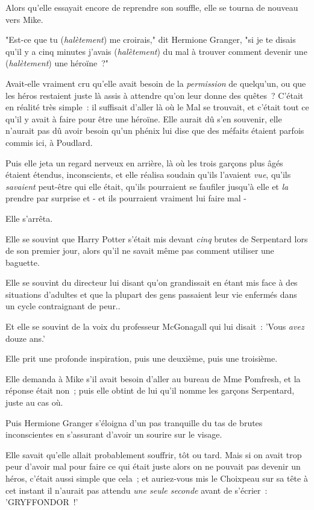 Alors qu'elle essayait encore de reprendre son souffle, elle se tourna de nouveau vers Mike.

"Est-ce que tu (\emph{halètement}) me croirais," dit Hermione Granger, "si je te disais qu'il y a cinq minutes j'avais (\emph{halètement}) du mal à trouver comment devenir une (\emph{halètement}) une héroïne~?"

Avait-elle vraiment cru qu'elle avait besoin de la \emph{permission} de quelqu'un, ou que les héros restaient juste là assis à attendre qu'on leur donne des quêtes~? C'était en réalité très simple~: il suffisait d'aller là où le Mal se trouvait, et c'était tout ce qu'il y avait à faire pour être une héroïne. Elle aurait dû s'en souvenir, elle n'aurait pas dû avoir besoin qu'un phénix lui dise que des méfaits étaient parfois commis ici, à Poudlard.

Puis elle jeta un regard nerveux en arrière, là où les trois garçons plus âgés étaient étendus, inconscients, et elle réalisa soudain qu'ils l'avaient \emph{vue}, qu'ils \emph{savaient} peut-être qui elle était, qu'ils pourraient se faufiler jusqu'à elle et \emph{la} prendre par surprise et - et ils pourraient vraiment lui faire mal -

Elle s'arrêta.

Elle se souvint que Harry Potter s'était mis devant \emph{cinq} brutes de Serpentard lors de son premier jour, alors qu'il ne savait même pas comment utiliser une baguette.

Elle se souvint du directeur lui disant qu'on grandissait en étant mis face à des situations d'adultes et que la plupart des gens passaient leur vie enfermés dans un cycle contraignant de peur..

Et elle se souvint de la voix du professeur McGonagall qui lui disait~: 'Vous \emph{avez} douze ans.'

Elle prit une profonde inspiration, puis une deuxième, puis une troisième.

Elle demanda à Mike s'il avait besoin d'aller au bureau de Mme Pomfresh, et la réponse était non~; puis elle obtint de lui qu'il nomme les garçons Serpentard, juste au cas où.

Puis Hermione Granger s'éloigna d'un pas tranquille du tas de brutes inconscientes en s'assurant d'avoir un sourire sur le visage.

Elle savait qu'elle allait probablement souffrir, tôt ou tard. Mais si on avait trop peur d'avoir mal pour faire ce qui était juste alors on ne pouvait pas devenir un héros, c'était aussi simple que cela~; et auriez-vous mis le Choixpeau sur sa tête à cet instant il n'aurait pas attendu \emph{une seule seconde} avant de s'écrier~: 'GRYFFONDOR~!'

